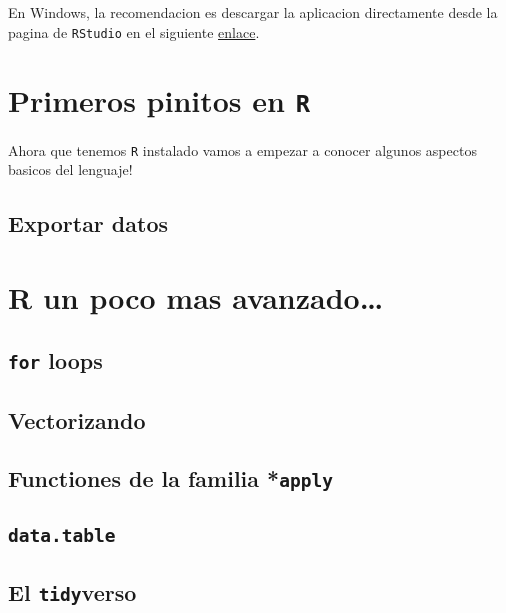 \documentclass[
]{book}
\begin{document}
En Windows, la recomendacion es descargar la aplicacion directamente desde la pagina de \texttt{RStudio} en el siguiente \href{https://www.rstudio.com/products/rstudio/}{enlace}.

\hypertarget{primeros-pinitos-en-r}{%
\section{\texorpdfstring{Primeros pinitos en \texttt{R}}{Primeros pinitos en R}}\label{primeros-pinitos-en-r}}

Ahora que tenemos \texttt{R} instalado vamos a empezar a conocer algunos aspectos basicos del lenguaje!

\hypertarget{exportar-datos}{%
\subsection{Exportar datos}\label{exportar-datos}}

\hypertarget{r-un-poco-mas-avanzado}{%
\section{R un poco mas avanzado\ldots{}}\label{r-un-poco-mas-avanzado}}

\hypertarget{for-loops}{%
\subsection{\texorpdfstring{\texttt{for} loops}{for loops}}\label{for-loops}}

\hypertarget{vectorizando}{%
\subsection{Vectorizando}\label{vectorizando}}

\hypertarget{functiones-de-la-familia-apply}{%
\subsection{\texorpdfstring{Functiones de la familia *\texttt{apply}}{Functiones de la familia *apply}}\label{functiones-de-la-familia-apply}}

\hypertarget{data.table}{%
\subsection{\texorpdfstring{\texttt{data.table}}{data.table}}\label{data.table}}

\hypertarget{el-tidyverso}{%
\subsection{\texorpdfstring{El \texttt{tidy}verso}{El tidyverso}}\label{el-tidyverso}}
\end{document}
